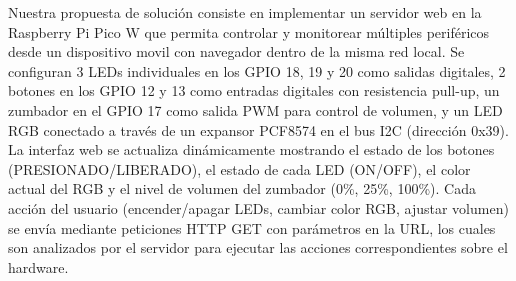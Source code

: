 \documentclass[letterpaper,12pt]{article}
\begin{document}
    Nuestra propuesta de solución consiste en implementar un servidor web en la Raspberry Pi Pico W que permita controlar y monitorear múltiples periféricos desde un dispositivo movil con navegador dentro de la misma red local. Se configuran 3 LEDs individuales en los GPIO 18, 19 y 20 como salidas digitales, 2 botones en los GPIO 12 y 13 como entradas digitales con resistencia pull-up, un zumbador en el GPIO 17 como salida PWM para control de volumen, y un LED RGB conectado a través de un expansor PCF8574 en el bus I2C (dirección 0x39). La interfaz web se actualiza dinámicamente mostrando el estado de los botones (PRESIONADO/LIBERADO), el estado de cada LED (ON/OFF), el color actual del RGB y el nivel de volumen del zumbador (0\%, 25\%, 100\%). Cada acción del usuario (encender/apagar LEDs, cambiar color RGB, ajustar volumen) se envía mediante peticiones HTTP GET con parámetros en la URL, los cuales son analizados por el servidor para ejecutar las acciones correspondientes sobre el hardware.
\end{document}

